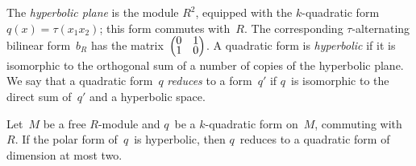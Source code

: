 \documentclass{lms}
\def\mat#1{\begin{pmatrix}#1\end{pmatrix}}
\def\smat{\def\arraystretch{.66}\mat}
\begin{document}
The \emph{hyperbolic plane} is the module $R^2$, equipped with the
$k$-quadratic form~$q(x) = τ(x_1 x_2)$; this form commutes with~$R$. The
corresponding $τ$-alternating bilinear form~$b_R$ has the
matrix~$\smat{0&1\\1&0}$. A quadratic form is \emph{hyperbolic} if it is
isomorphic to the orthogonal sum of a number of copies of the hyperbolic
plane.
We say that a quadratic form~$q$ \emph{reduces} to a form~$q'$ if $q$~is
isomorphic to the direct sum of~$q'$ and a hyperbolic space.

\begin{prop}\label{prop:witt-four}
Let~$M$ be a free $R$-module and $q$~be a $k$-quadratic form on~$M$,
commuting with~$R$.
If the polar form of~$q$~is hyperbolic, then $q$~reduces to a quadratic
form of dimension at most two.
\end{prop}
\end{document}
